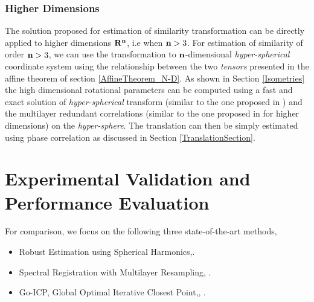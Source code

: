 \documentclass{UCF_ETD}
\begin{document}
\subsubsection{Higher Dimensions}
The solution proposed for estimation of similarity transformation can be directly applied to higher dimensions ${\bf R^{\bf n}} $, i.e when $ {\bf n} > 3$. For estimation of similarity of order ${\bf n} > 3$, we can use the transformation to ${\bf n}$-dimensional \emph{hyper-spherical} coordinate system using the relationship between the two \emph{tensors} presented in the affine theorem of section \ref{AffineTheorem_N-D}. As shown in Section \ref{Isometries} the high dimensional rotational parameters can be computed using a fast and exact solution of \emph{hyper-spherical} transform (similar to the one proposed in \cite{Alam2015}) and the multilayer redundant correlations (similar to the one proposed in \cite{Kostelec2008} for higher dimensions) on the \emph{hyper-sphere}. The translation can then be simply estimated using phase correlation as discussed in Section \ref{TranslationSection}. 

\section{Experimental Validation and Performance Evaluation} \label{Experiments3D}
For comparison, we focus on the following three state-of-the-art methods,

\begin{itemize}
\item Robust Estimation using Spherical Harmonics,\cite{Salah2013}.
\item Spectral Registration with Multilayer Resampling,  \cite{Bulow2013}.
\item Go-ICP, Global Optimal Iterative Closest Point,\cite{Jiaolong2013}, \cite{Jiaolong2016}.
\end{itemize}
\end{document}
